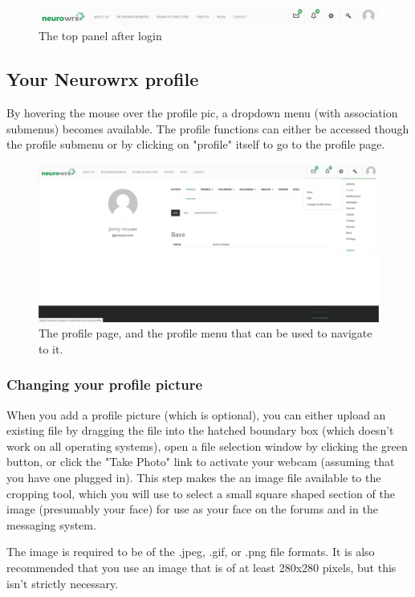 \documentclass[10pt]{article}
\begin{document}
\begin{figure}[h]
    \centering
    \includegraphics[scale=0.3]{images/topbarlogged.jpg}
    \caption{The top panel after login}
    \label{topbarlogged}
\end{figure}

\subsection{Your Neurowrx profile}

\begin{flushleft}
By hovering the mouse over the profile pic, a dropdown menu (with association submenus) becomes available.  The profile functions can either be accessed though the profile submenu or by clicking on "profile" itself to go to the profile page.  
\end{flushleft}

\begin{figure}[H]
    \centering
    \includegraphics[scale=0.2]{images/profile.jpg}
    \caption{The profile page, and the profile menu that can be used to navigate to it.}
    \label{profilepage}
\end{figure}

\subsubsection{Changing your profile picture}

\begin{flushleft}
When you add a profile picture (which is optional), you can either upload an existing file by dragging the file into the hatched boundary box (which doesn't work on all operating systems), open a file selection window by clicking the green button, or click the "Take Photo" link to activate your webcam (assuming that you have one plugged in).  This step makes the an image file available to the cropping tool, which you will use to select a small square shaped section of the image (presumably your face) for use as your face on the forums and in the messaging system. 

\end{flushleft}
 The image is required to be of the .jpeg, .gif, or .png file formats.  It is also recommended that you use an image that is of at least 280x280 pixels, but this isn't strictly necessary. 
\begin{flushleft}

\end{flushleft}
\end{document}

